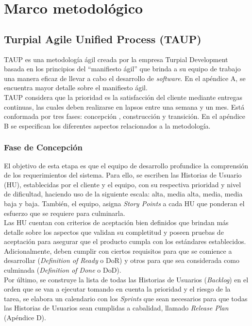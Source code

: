\chapter{\textbf{Marco metodológico}}

\thispagestyle{empty}

\section{Turpial Agile Unified Process (TAUP)}

TAUP es una metodología ágil creada por la empresa Turpial Development basada en los principios del “manifiesto ágil” que brinda a su equipo de trabajo una manera eficaz de llevar a cabo el desarrollo de \textit{software}. En el apéndice A, se encuentra mayor detalle sobre el manifiesto ágil. \\

TAUP considera que la prioridad es la satisfacción del cliente mediante entregas continuas, las cuales deben realizarse en lapsos entre una semana y un mes. Está conformada por tres fases: concepción , construcción y transición. En el apéndice B se especifican los diferentes aspectos relacionados a la metodología.

\subsection{Fase de Concepción}

El objetivo de esta etapa es que el equipo de desarrollo profundice la comprensión de los requerimientos del sistema. Para ello, se escriben las Historias de Usuario (HU), establecidas por el cliente y el equipo, con su respectiva prioridad y nivel de dificultad, haciendo uso de la siguiente escala: alta, media alta, media, media baja y baja. También, el equipo, asigna \textit{Story Points} a cada HU que ponderan el esfuerzo que se requiere para culminarla.\\

Las HU cuentan con criterios de aceptación bien definidos que brindan más detalle sobre los aspectos que validan su completitud y poseen pruebas de aceptación para asegurar que el producto cumpla con los estándares establecidos. Adicionalmente, deben cumplir con ciertos requisitos para que se comience a desarrollar (\textit{Definition of Ready} o DoR) y otros para que sea considerada como culminada (\textit{Definition of Done} o DoD).\\

Por último, se construye la lista de todas las Historias de Usuarios (\textit{Backlog}) en el orden que se van a ejecutar tomando en cuenta la prioridad y el riesgo de la tarea, se elabora un calendario con los \textit{Sprints} que sean necesarios para que todas las Historias de Usuarios sean cumplidas a cabalidad, llamado \textit{Release Plan} (Apéndice D).


